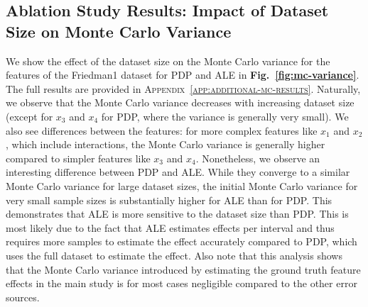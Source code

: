 \documentclass[runningheads]{llncs}
\begin{document}
\subsection{Ablation Study Results: Impact of Dataset Size on Monte Carlo Variance}\label{sec:results-dataset-size}

We show the effect of the dataset size on the Monte Carlo variance for the features of the Friedman1 dataset
for PDP and ALE in \textbf{Fig.\@~\ref{fig:mc-variance}}. The full results are provided in \textsc{Appendix~\ref{app:additional-mc-results}}.
Naturally, we observe that the Monte Carlo variance decreases with increasing dataset size (except for $x_3$ and $x_4$ for PDP,
where the variance is generally very small). We also see differences between the features: for more complex features like $x_1$ and $x_2$,
which include interactions, the Monte Carlo variance is generally higher compared to simpler features like $x_3$ and $x_4$.
Nonetheless, we observe an interesting difference between PDP and ALE. While they converge to a similar Monte Carlo variance for  %
large dataset sizes, the initial Monte Carlo variance for very small sample sizes is substantially higher for ALE than for PDP.  %
This demonstrates that ALE is more sensitive to the dataset size than PDP. This is most likely due to the fact that ALE  %
estimates effects per interval and thus requires more samples to estimate the effect accurately compared to PDP, which
uses the full dataset to estimate the effect. Also note that this analysis shows that the Monte Carlo variance introduced
by estimating the ground truth feature effects in the main study is for most cases negligible compared to the other error sources. 
\end{document}
